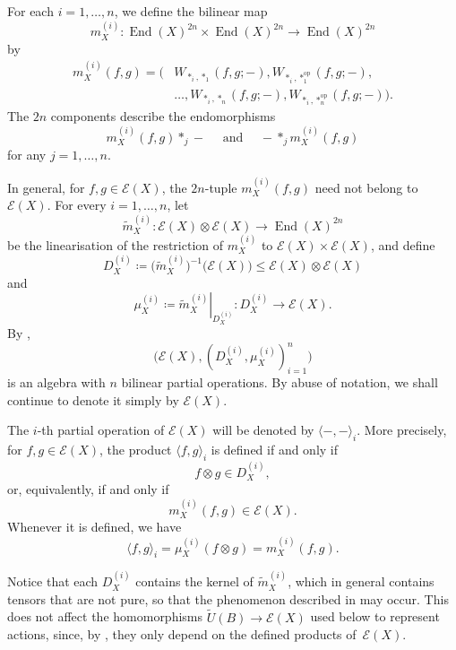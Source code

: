 \documentclass[reqno,a4paper]{amsart}
\theoremstyle{plain}
\theoremstyle{definition}
\theoremstyle{remark}
\numberwithin{equation}{section}
\newcommand{\E}{\mathcal{E}}
\DeclareMathOperator{\op}{op}
\DeclareMathOperator{\End}{End}
\begin{document}
For each $i=1,\ldots,n$, we define the bilinear map
\[
m_X^{(i)}\colon
\End(X)^{2n}\times\End(X)^{2n}\to\End(X)^{2n}
\]
by
\begin{align*}
m_X^{(i)}(f,g)
=
\bigl(
&W_{\ast_i,\ast_1}(f,g;-),
W_{\ast_i,\ast_1^{\op}}(f,g;-),\\
&\ldots,
W_{\ast_i,\ast_n}(f,g;-),
W_{\ast_i,\ast_n^{\op}}(f,g;-)
\bigr).
\end{align*}
The $2n$ components describe the endomorphisms
\[
m_X^{(i)}(f,g)\ast_j-
\quad \text{ and } \quad
-\ast_j m_X^{(i)}(f,g)
\]
for any $j=1,\ldots,n$.

In general, for $f,g\in\E(X)$, the $2n$-tuple $m_X^{(i)}(f,g)$ need not belong to $\E(X)$. For every $i=1,\ldots,n$, let
\[
\widetilde m_X^{(i)}\colon\E(X)\otimes\E(X)\to\End(X)^{2n}
\]
be the linearisation of the restriction of $m_X^{(i)}$ to $\E(X)\times\E(X)$, and define
\[
D_X^{(i)}\coloneqq\bigl(\widetilde m_X^{(i)}\bigr)^{-1}\bigl(\E(X)\bigr)\leq\E(X)\otimes\E(X)
\]
and
\[
\mu_X^{(i)}\coloneqq\left.\widetilde m_X^{(i)}\right|_{D_X^{(i)}}\colon D_X^{(i)}\to\E(X).
\]
By ,
\[
\bigl(\E(X),(D_X^{(i)},\mu_X^{(i)})_{i=1}^n\bigr)
\]
is an algebra with $n$ bilinear partial operations. By abuse of notation, we shall continue to denote it simply by $\E(X)$.

The $i$-th partial operation of $\E(X)$ will be denoted by $\langle-,-\rangle_i$. More precisely, for $f,g\in\E(X)$, the product $\langle f,g\rangle_i$ is defined if and only if
\[
f\otimes g\in D_X^{(i)},
\]
or, equivalently, if and only if
\[
m_X^{(i)}(f,g)\in\E(X).
\]
Whenever it is defined, we have
\[
\langle f,g\rangle_i=\mu_X^{(i)}(f\otimes g)=m_X^{(i)}(f,g).
\]

Notice that each $D_X^{(i)}$ contains the kernel of $\widetilde m_X^{(i)}$, which in general contains tensors that are not pure, so that the phenomenon described in  may occur. This does not affect the homomorphisms $\widetilde U(B)\to\E(X)$ used below to represent actions, since, by , they only depend on the defined products of~$\E(X)$.
\end{document}
